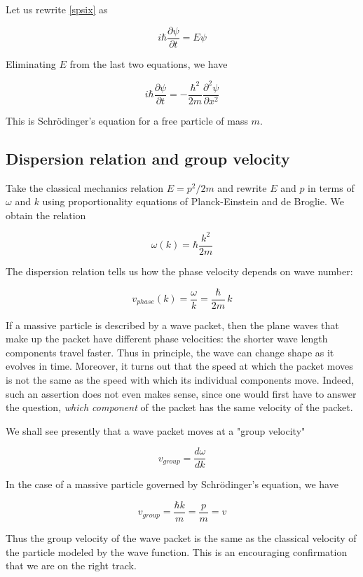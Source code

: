 Let us rewrite \eqref{spsix} as 

\begin{equation}
i\hbar \frac{\partial\psi}{\partial t} = E\psi
\end{equation}

Eliminating $E$ from the last two equations, we have

\begin{equation}
i\hbar \frac{\partial\psi}{\partial t} = -\frac{\hbar^2}{2m} \frac{\partial^2 \psi}{\partial x^2}
\end{equation}

This is Schrödinger's equation for  a free particle of mass $m$. 

\subsection{Dispersion relation and group velocity}

Take the classical mechanics relation  $E = p^2/2m$ and rewrite $E$ and $p$ in terms of $\omega$ and $k$ using proportionality equations of Planck-Einstein and de Broglie. We obtain the relation  

\begin{equation}
\omega(k) = \hbar \frac{k^2}{2m}
\end{equation}

The dispersion relation tells us how the phase velocity  depends on wave number:

\begin{equation}
v_{phase}(k) = \frac{\omega}{k} = \frac{\hbar}{2m}\,k
\end{equation}

If a massive particle is described by a wave packet, then the plane waves that make up the packet have different phase velocities: the shorter wave length components travel faster.  Thus in principle, the wave can change shape as it evolves in time.  Moreover, it turns out that the speed at which the packet moves is not the same as the speed with which its individual components move.  Indeed, such an assertion does not even makes sense, since one would first have to answer the question, \emph{which component} of the packet has the same velocity of the packet.  

We shall see presently that a wave packet moves at a "group velocity"

\begin{equation}
v_{group}  = \frac{d\omega}{dk}
\end{equation}

In the case of a massive particle governed by Schrödinger's equation,  we have

\begin{equation}
v_{group}  = \frac{\hbar k}{m} = \frac{p}{m} = v
\end{equation}

Thus the group velocity of the wave packet is the same as the classical velocity of the particle modeled by the wave function.  This is an encouraging confirmation that we are on the right track.
